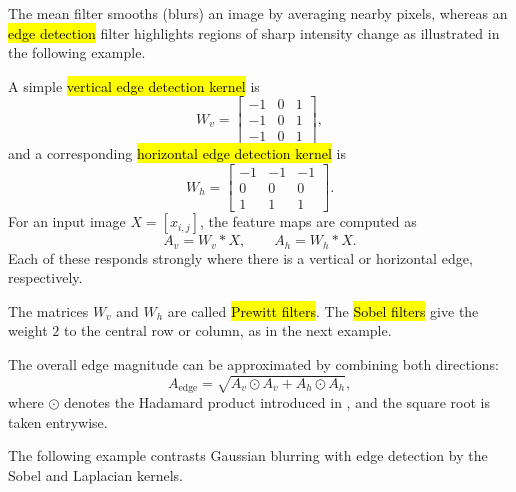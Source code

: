 The mean filter smooths (blurs) an image by averaging nearby pixels, whereas
an \hl{edge detection} filter highlights regions of sharp intensity change as illustrated in the following example. 
\begin{example}

A simple \hl{vertical edge detection kernel} is
$$
W_v =
\begin{bmatrix}
-1 & 0 & 1\\
-1 & 0 & 1\\
-1 & 0 & 1
\end{bmatrix},
$$
and a corresponding \hl{horizontal edge detection kernel} is
$$
W_h =
\begin{bmatrix}
-1 & -1 & -1\\
0 & 0 & 0\\
1 & 1 & 1
\end{bmatrix}.
$$
For an input image $X = [x_{i,j}]$, the feature maps are computed as
$$
A_v = W_v * X,
\qquad
A_h = W_h * X.
$$
Each of these responds strongly where there is a vertical or horizontal edge, respectively.

The matrices $W_v$ and $W_h$ are called \hl{Prewitt filters}. The \hl{Sobel filters} give the weight $2$ to the central row or column, as in the next example.
 
\medskip
The overall edge magnitude can be approximated by combining both directions:
$$
A_{\text{edge}} = \sqrt{A_v \odot A_v + A_h \odot A_h},
$$
where $\odot$ denotes the Hadamard product introduced in , and the square root is taken entrywise.
\end{example}
The following example contrasts Gaussian blurring with edge detection by the Sobel and Laplacian kernels.

